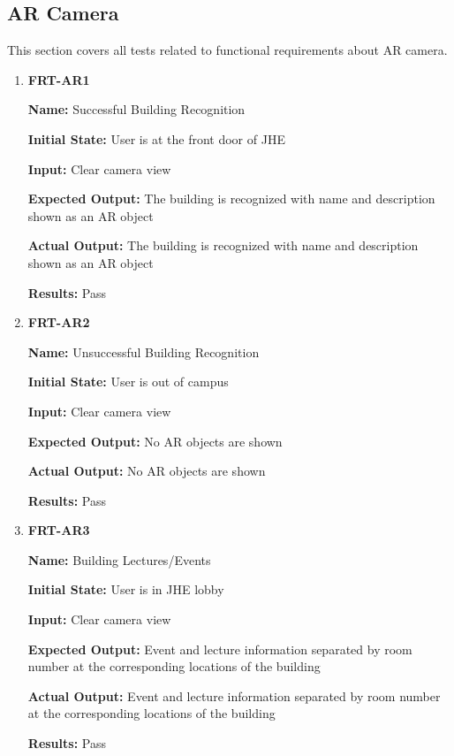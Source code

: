 \documentclass[12pt, titlepage]{article}
\begin{document}
\subsection{AR Camera}
This section covers all tests related to functional requirements about AR camera.
\begin{enumerate}
\item \textbf{FRT-AR1}

\textbf{Name:} Successful Building Recognition

\textbf{Initial State:} User is at the front door of JHE

\textbf{Input:} Clear camera view
					
\textbf{Expected Output:} The building is recognized with name and description shown as an AR object

\textbf{Actual Output:} The building is recognized with name and description shown as an AR object

\textbf{Results:} Pass

\item \textbf{FRT-AR2}

\textbf{Name:} Unsuccessful Building Recognition

\textbf{Initial State:} User is out of campus

\textbf{Input:} Clear camera view
					
\textbf{Expected Output:} No AR objects are shown

\textbf{Actual Output:} No AR objects are shown

\textbf{Results:} Pass

\item \textbf{FRT-AR3}

\textbf{Name:} Building Lectures/Events

\textbf{Initial State:} User is in JHE lobby

\textbf{Input:} Clear camera view
					
\textbf{Expected Output:} Event and lecture information separated by room number at the corresponding locations of the building

\textbf{Actual Output:} Event and lecture information separated by room number at the corresponding locations of the building

\textbf{Results:} Pass
\end{enumerate}
\end{document}
